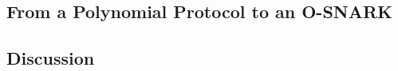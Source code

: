 \subsection{From a Polynomial Protocol to an O-SNARK}
\label{sec:interesting}

\subsection{Discussion}
\label{sec:discussion}

